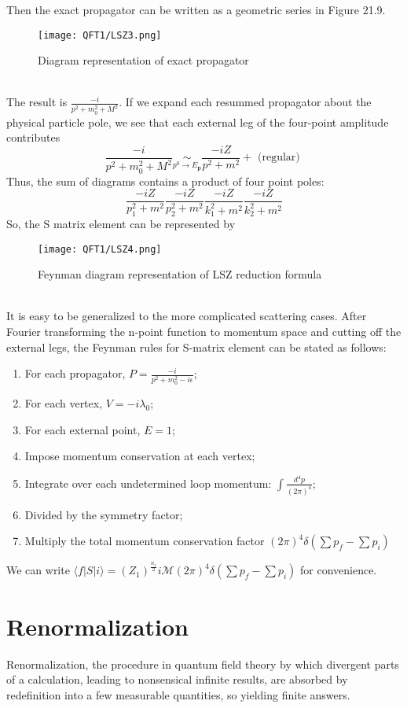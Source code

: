 \noindent
Then the exact propagator can be written as a geometric series in
Figure 21.9.
\begin{figure}[!h]
\centering
\texttt{[image: QFT1/LSZ3.png]}
\caption{Diagram representation of exact propagator}
\end{figure}\\
The result is $\frac{-i}{p^2 + m_0^2 + M^2}$. If we expand each resummed propagator about the physical particle pole, we see that each external leg of the four-point amplitude contributes
\[\frac{-i}{p^2 + m_0^2 + M^2} \underset{p^0 \to E_{\bm{p}}}{\sim} \frac{-iZ}{p^2+m^2} + \mbox{ (regular) }\]
Thus, the sum of diagrams contains a product of four point poles:
\[\frac{-iZ}{p_1^2 + m^2} \frac{-iZ}{p_2^2 + m^2} \frac{-iZ}{k_1^2 + m^2} \frac{-iZ}{k_2^2 + m^2}\]
So, the S matrix element can be represented by 
\begin{figure}[!h]
\centering
\texttt{[image: QFT1/LSZ4.png]}
\caption{Feynman diagram representation of LSZ reduction formula}
\end{figure}\\
It is easy to be generalized to the more complicated scattering cases. After Fourier transforming the n-point function to momentum space and cutting off the external legs, the Feynman rules for S-matrix element can be stated as follows:
\begin{enumerate}
\item For each propagator, $P = \frac{-i}{p^2 + m_0^2 -i\epsilon}$;
\item For each vertex, $V = -i\lambda_0$;
\item For each external point, $E=1$;
\item Impose momentum conservation at each vertex;
\item Integrate over each undetermined loop momentum: $\int \frac{d^4p}{(2\pi)^4}$;
\item Divided by the symmetry factor;
\item Multiply the total momentum conservation factor $(2\pi)^4 \delta(\sum p_f - \sum p_i)$ 
\end{enumerate}
We can write $\langle f | S | i \rangle = (Z_1)^{\frac{n_s}{2}} i \mathcal{M} (2\pi)^4 \delta(\sum p_f - \sum p_i)$ for convenience.

\section{Renormalization}
\noindent
Renormalization, the procedure in quantum field theory by which divergent parts of a calculation, leading to nonsensical infinite results, are absorbed by redefinition into a few measurable quantities, so yielding finite answers.

